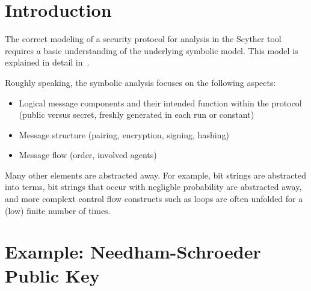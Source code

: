 \documentclass{book}
\begin{document}
\section{Introduction}

The correct modeling of a security protocol for analysis in the Scyther
tool requires a basic understanding of the underlying 
symbolic model. This model is explained in detail in~\cite{opsembook}.

Roughly speaking, the symbolic analysis focuses on the following
aspects:
\begin{itemize}

	\item Logical message components and their intended function within the
		protocol (public versus
		secret, freshly generated in each run or constant)
	\item Message structure (pairing, encryption, signing, hashing)
	\item Message flow (order, involved agents)

\end{itemize}
Many other elements are abstracted away. For example, bit strings are
abstracted into terms, bit strings that occur with negligble probability
are abstracted away, and more complext control flow constructs such as
loops are often unfolded for a (low) finite number of times.

%

\section{Example: Needham-Schroeder Public Key}
\end{document}
